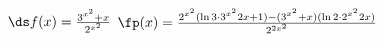 {$\ds f(x) = \frac{3^{x^2}+x}{2^{x^2}}$
}
{$\fp(x) = \frac{2^{x^2}(\ln 3\cdot 3^{x^2}2x+1) - (3^{x^2}+x)(\ln 2\cdot 2^{x^2}2x)}{2^{2x^2}}$
}
